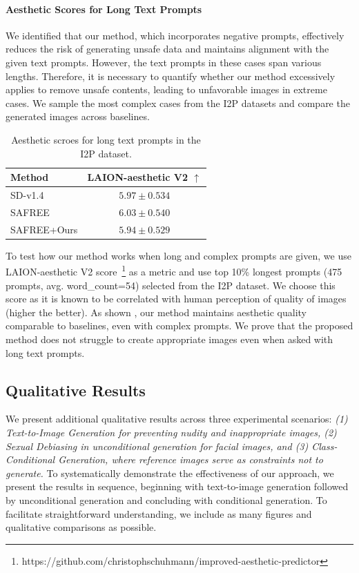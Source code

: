 \paragraph{Aesthetic Scores for Long Text Prompts} 
We identified that our method, which incorporates negative prompts, effectively reduces the risk of generating unsafe data and maintains alignment with the given text prompts. However, the text prompts in these cases span various lengths. Therefore, it is necessary to quantify whether our method excessively applies to remove unsafe contents, leading to unfavorable images in extreme cases. We sample the most complex cases from the I2P datasets and compare the generated images across baselines. 

\begin{table}[!ht]
    \caption{Aesthetic scroes for long text prompts in the I2P dataset.} 
    \label{tab:aes} 
    \centering 
    \begin{tabular}{lc} 
    \toprule 
    Method      & LAION-aesthetic V2 $\uparrow$ \\
    \midrule 
    SD-v1.4          & $5.97 \pm 0.534$         \\
    SAFREE      & $6.03 \pm 0.540$              \\
    SAFREE+Ours & $5.94 \pm 0.529$              \\
    \bottomrule 
    \end{tabular}
\end{table}


To test how our method works when long and complex prompts are given, we use LAION-aesthetic V2 score~\footnote{https://github.com/christophschuhmann/improved-aesthetic-predictor} as a metric and use top 10\% longest prompts (475 prompts, avg. word\_count=54) selected from the I2P dataset. We choose this score as it is known to be correlated with human perception of quality of images (higher the better). As shown , our method maintains aesthetic quality comparable to baselines, even with complex prompts. We prove that the proposed method does not struggle to create appropriate images even when asked with long text prompts.  

\subsection{Qualitative Results}
We present additional qualitative results across three experimental scenarios: \textit{(1) Text-to-Image Generation for preventing nudity and inappropriate images, (2) Sexual Debiasing in unconditional generation for facial images, and (3) Class-Conditional Generation, where reference images serve as constraints not to generate.} To systematically demonstrate the effectiveness of our approach, we present the results in sequence, beginning with text-to-image generation followed by unconditional generation and concluding with conditional generation. To facilitate straightforward understanding, we include as many figures and qualitative comparisons as possible.

